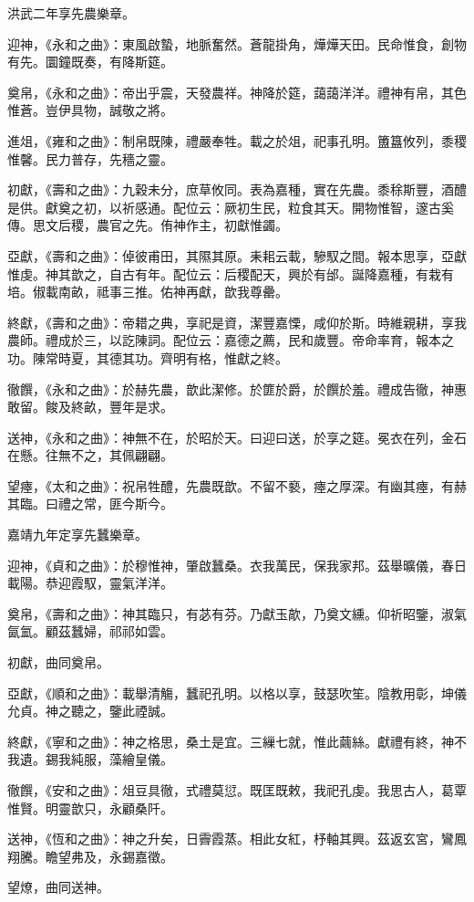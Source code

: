 洪武二年享先農樂章。

迎神，《永和之曲》：東風啟蟄，地脈奮然。蒼龍掛角，燁燁天田。民命惟食，創物有先。圜鐘既奏，有降斯筵。

奠帛，《永和之曲》：帝出乎震，天發農祥。神降於筵，藹藹洋洋。禮神有帛，其色惟蒼。豈伊具物，誠敬之將。

進俎，《雍和之曲》：制帛既陳，禮嚴奉牲。載之於俎，祀事孔明。簠簋攸列，黍稷惟馨。民力普存，先穡之靈。

初獻，《壽和之曲》：九穀未分，庶草攸同。表為嘉種，實在先農。黍稌斯豐，酒醴是供。獻奠之初，以祈感通。配位云：厥初生民，粒食其天。開物惟智，邃古奚傳。思文后稷，農官之先。侑神作主，初獻惟蠲。

亞獻，《壽和之曲》：倬彼甫田，其隰其原。耒耜云載，驂馭之間。報本思享，亞獻惟虔。神其歆之，自古有年。配位云：后稷配天，興於有邰。誕降嘉種，有栽有培。俶載南畝，祗事三推。佑神再獻，歆我尊罍。

終獻，《壽和之曲》：帝耤之典，享祀是資，潔豐嘉慄，咸仰於斯。時維親耕，享我農師。禮成於三，以訖陳詞。配位云：嘉德之薦，民和歲豐。帝命率育，報本之功。陳常時夏，其德其功。齊明有格，惟獻之終。

徹饌，《永和之曲》：於赫先農，歆此潔修。於篚於爵，於饌於羞。禮成告徹，神惠敢留。餕及終畝，豐年是求。

送神，《永和之曲》：神無不在，於昭於天。曰迎曰送，於享之筵。冕衣在列，金石在懸。往無不之，其佩翩翩。

望瘞，《太和之曲》：祝帛牲醴，先農既歆。不留不褻，瘞之厚深。有幽其瘞，有赫其臨。曰禮之常，匪今斯今。

嘉靖九年定享先蠶樂章。

迎神，《貞和之曲》：於穆惟神，肇啟蠶桑。衣我萬民，保我家邦。茲舉曠儀，春日載陽。恭迎霞馭，靈氣洋洋。

奠帛，《壽和之曲》：神其臨只，有苾有芬。乃獻玉歊，乃奠文纁。仰祈昭鑒，淑氣氤氳。顧茲蠶婦，祁祁如雲。

初獻，曲同奠帛。

亞獻，《順和之曲》：載舉清觴，蠶祀孔明。以格以享，鼓瑟吹笙。陰教用彰，坤儀允貞。神之聽之，鑒此禋誠。

終獻，《寧和之曲》：神之格思，桑土是宜。三繅七就，惟此繭絲。獻禮有終，神不我遺。錫我純服，藻繪皇儀。

徹饌，《安和之曲》：俎豆具徹，式禮莫愆。既匡既敕，我祀孔虔。我思古人，葛覃惟賢。明靈歆只，永顧桑阡。

送神，《恆和之曲》：神之升矣，日霽霞蒸。相此女紅，杼軸其興。茲返玄宮，鸞鳳翔騰。瞻望弗及，永錫嘉徵。

望燎，曲同送神。

